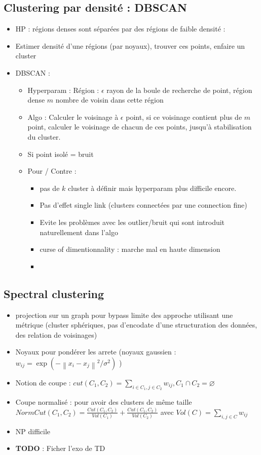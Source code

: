\documentclass{article}
\begin{document}
\subsection{Clustering par densité : DBSCAN}
\begin{itemize}
    \item HP : régions denses sont séparées par des régions de faible densité : 
    \item Estimer densité d'une régions (par noyaux), trouver ces points, enfaire un cluster
    \item DBSCAN : \begin{itemize}
        \item Hyperparam : Région : $ \epsilon  $ rayon de la boule de recherche de point, région dense $ m $  nombre de voisin dans cette région
        \item Algo : Calculer le voisinage à $ \epsilon  $ point, si ce voisinage contient plus de $ m $ point, calculer le voisinage de chacun de ces points, jusqu'à stabilisation du cluster.
        \item Si point isolé = bruit
        \item Pour / Contre : \begin{itemize}
            \item pas de $ k $ cluster à définir mais hyperparam plus difficile encore. 
            \item Pas d'effet single link (clusters connectées par une connection fine)
            \item Evite les problèmes avec les outlier/bruit qui sont introduit naturellement dans l'algo
            \item curse of dimentionnality : marche mal en haute dimension
            \item 
        \end{itemize}
    \end{itemize}
\end{itemize}

\subsection{Spectral clustering}
\begin{itemize}
    \item projection sur un graph pour bypass limite des approche utilisant une métrique (cluster sphériques, pas d'encodate d'une structuration des données, des relation de voisinages) 
    \item Noyaux pour pondérer les arrete (noyaux gaussien : $ w_{ij} = \exp (- \left\| x_i - x_j \right\|^2 / \sigma ^2 ) $ )
    \item Notion de coupe : $ cut(C_1, C_2) = \sum_{i \in C_1, j \in C_2} w_{ij}, C_1 \cap C_2 = \varnothing $ 
    \item Coupe normalisé : pour avoir des clusters de même taille $ NormCut(C_1, C_2) = \frac{Cut(C_1, C_2)}{Vol(C_1)} + \frac{Cut(C_1, C_2)}{Vol(C_2)} $ avec $ Vol(C) = \sum_{i, j \in C} w_{ij}$  
    \item NP difficile
    \item \textbf{TODO} : Ficher l'exo de TD
\end{itemize}
\end{document}
